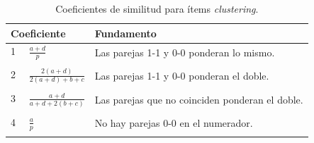 \documentclass[spanish]{beamer}
\begin{document}
\begin{frame}{}

\begin{table}[H]
  \centering
  \caption{Coeficientes de similitud para ítems \textit{clustering}.}
\resizebox{10cm}{!} {
\begin{tabular}{ll}
\toprule               
\multicolumn{1}{l}{Coeficiente} & \multicolumn{1}{l}{Fundamento}\\
\midrule
1 $\quad\frac{a+d}{p}$                            & Las parejas 1-1 y 0-0 ponderan lo mismo.\\ \\
2 $\quad\frac{2(a+d)}{2(a+d)+b+c}$                            & Las parejas 1-1 y 0-0 ponderan el doble.                                                                                                        \\\\
3 $\quad\frac{a+d}{a+d+2(b+c)}$                             & Las parejas que no coinciden ponderan el doble.                                                                                                 \\\\
4  $\quad\frac{a}{p}$                             & No hay parejas 0-0 en el numerador.                                                                                                    \\         \\
\bottomrule
\end{tabular}
}
\end{table}

\end{frame}
\end{document}
